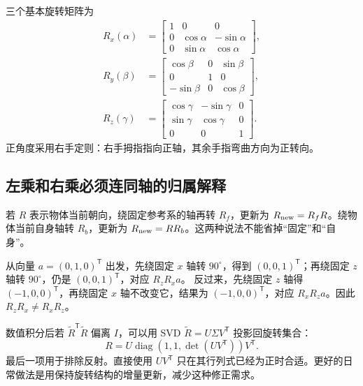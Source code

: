 三个基本旋转矩阵为
\begin{align}
 R_x(\alpha)&=\begin{bmatrix}1&0&0\\0&\cos\alpha&-\sin\alpha\\0&\sin\alpha&\cos\alpha\end{bmatrix},\\
 R_y(\beta)&=\begin{bmatrix}\cos\beta&0&\sin\beta\\0&1&0\\-\sin\beta&0&\cos\beta\end{bmatrix},\\
 R_z(\gamma)&=\begin{bmatrix}\cos\gamma&-\sin\gamma&0\\\sin\gamma&\cos\gamma&0\\0&0&1\end{bmatrix}.
\end{align}
正角度采用右手定则：右手拇指指向正轴，其余手指弯曲方向为正转向。

\subsection{左乘和右乘必须连同轴的归属解释}
若 $R$ 表示物体当前朝向，绕固定参考系的轴再转 $R_f$，更新为 $R_{\rm new}=R_fR$。绕物体当前自身轴转 $R_b$，更新为 $R_{\rm new}=RR_b$。这两种说法不能省掉“固定”和“自身”。
\begin{examplebox}[算例 两次九十度旋转确实不交换]
从向量 $a=(0,1,0)^\mathsf T$ 出发，先绕固定 $x$ 轴转 $90^\circ$，得到 $(0,0,1)^\mathsf T$；再绕固定 $z$ 轴转 $90^\circ$，仍是 $(0,0,1)^\mathsf T$，对应 $R_zR_xa$。
反过来，先绕固定 $z$ 轴得 $(-1,0,0)^\mathsf T$，再绕固定 $x$ 轴不改变它，结果为 $(-1,0,0)^\mathsf T$，对应 $R_xR_za$。因此 $R_zR_x\ne R_xR_z$。
\end{examplebox}

数值积分后若 $\tilde R^\mathsf T\tilde R$ 偏离 $I$，可以用 SVD $\tilde R=U\Sigma V^\mathsf T$ 投影回旋转集合：
\begin{equation}
 R=U\operatorname{diag}(1,1,\det(UV^\mathsf T))V^\mathsf T.
\end{equation}
最后一项用于排除反射。直接使用 $UV^\mathsf T$ 只在其行列式已经为正时合适。更好的日常做法是用保持旋转结构的增量更新，减少这种修正需求。

